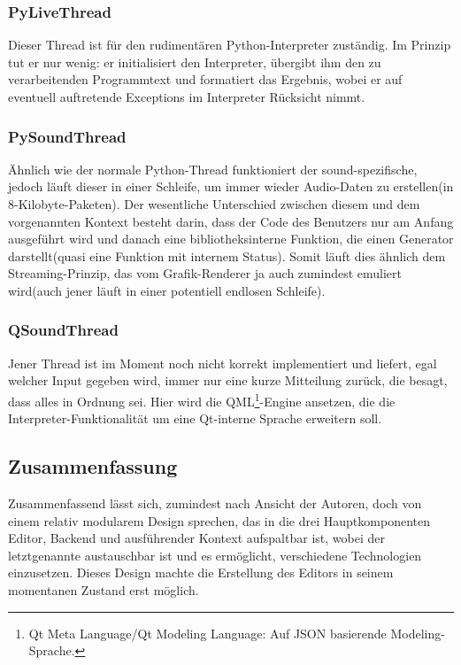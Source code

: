 \subsubsection{PyLiveThread}
    Dieser Thread ist für den rudimentären Python-Interpreter zuständig. Im Prinzip tut er nur wenig: er initialisiert den Interpreter, übergibt ihm den zu verarbeitenden Programmtext
    und formatiert das Ergebnis, wobei er auf eventuell auftretende Exceptions im Interpreter Rücksicht nimmt.

\subsubsection{PySoundThread}
    Ähnlich wie der normale Python-Thread funktioniert der sound-spezifische, jedoch läuft dieser in einer Schleife, um immer wieder Audio-Daten zu erstellen(in 8-Kilobyte-Paketen).
    Der wesentliche Unterschied zwischen diesem und dem vorgenannten Kontext besteht darin, dass der Code des Benutzers nur am Anfang ausgeführt wird und danach eine bibliotheksinterne
    Funktion, die einen Generator darstellt(quasi eine Funktion mit internem Status). Somit läuft dies ähnlich dem Streaming-Prinzip, das vom Grafik-Renderer ja auch zumindest emuliert 
    wird(auch jener läuft in einer potentiell endlosen Schleife).

\subsubsection{QSoundThread}
    Jener Thread ist im Moment noch nicht korrekt implementiert und liefert, egal welcher Input gegeben wird, immer nur eine kurze Mitteilung zurück, die besagt, dass alles in Ordnung
    sei. Hier wird die QML\footnote{Qt Meta Language/Qt Modeling Language: Auf JSON basierende Modeling-Sprache.}-Engine ansetzen, die die Interpreter-Funktionalität um eine Qt-interne 
    Sprache erweitern soll.

\subsection{Zusammenfassung}
    Zusammenfassend lässt sich, zumindest nach Ansicht der Autoren, doch von einem relativ modularem Design sprechen, das in die drei Hauptkomponenten Editor, Backend und ausführender 
    Kontext aufspaltbar ist, wobei der letztgenannte austauschbar ist und es ermöglicht, verschiedene Technologien einzusetzen. Dieses Design machte die Erstellung des Editors in seinem
    momentanen Zustand erst möglich.

